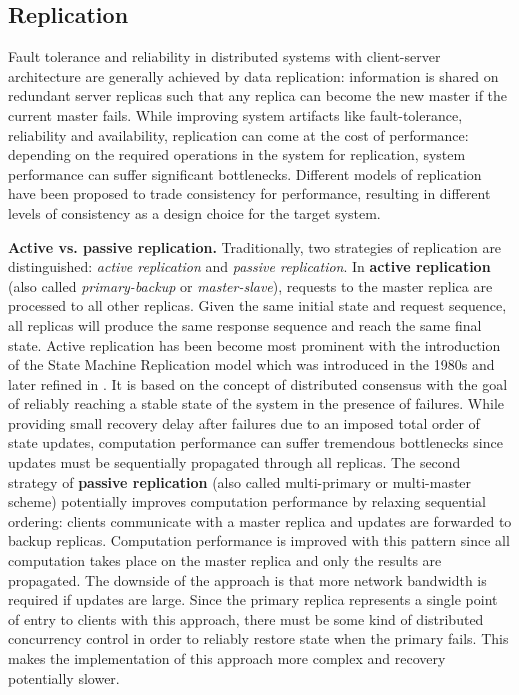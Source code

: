\subsection{Replication}
\label{sec:replication}

Fault tolerance and reliability in distributed systems with client-server architecture are generally achieved by data replication: information is shared on redundant server replicas such that any replica can become the new master if the current master fails. While improving system artifacts like fault-tolerance, reliability and availability, replication can come at the cost of performance: depending on the required operations in the system for replication, system performance can suffer significant bottlenecks. Different models of replication have been proposed to trade consistency for performance, resulting in different levels of consistency as a design choice for the target system.

\textbf{Active vs. passive replication.} Traditionally, two strategies of replication are distinguished: \textit{active replication} and \textit{passive replication}. In \textbf{active replication} (also called \textit{primary-backup} or \textit{master-slave}), requests to the master replica are processed to all other replicas. Given the same initial state and request sequence, all replicas will produce the same response sequence and reach the same final state. Active replication has been become most prominent with the introduction of the State Machine Replication model which was introduced in the 1980s \cite{Lamport:1984} and later refined in \cite{Schneider:1990}. It is based on the concept of distributed consensus with the goal of reliably reaching a stable state of the system in the presence of failures. While providing small recovery delay after failures due to an imposed total order of state updates, computation performance can suffer tremendous bottlenecks since updates must be sequentially propagated through all replicas. The second strategy of \textbf{passive replication} (also called multi-primary or multi-master scheme) potentially improves computation performance by relaxing sequential ordering: clients communicate with a master replica and updates are forwarded to backup replicas. Computation performance is improved with this pattern since all computation takes place on the master replica and only the results are propagated. The downside of the approach is that more network bandwidth is required if updates are large. Since the primary replica represents a single point of entry to clients with this approach, there must be some kind of distributed concurrency control in order to reliably restore state when the primary fails. This makes the implementation of this approach more complex and recovery potentially slower.

